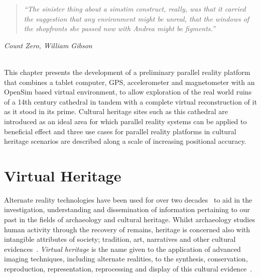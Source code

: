 \begin{quote}
	\textit{``The sinister thing about a simstim construct, really, was that it carried the suggestion that any environment might be unreal, that the windows of the shopfronts she passed now with Andrea might be figments.''}
\end{quote}
\hfill \textit{Count Zero, William Gibson}
\\
\\


\label{chapter-vtw}

This chapter presents the development of a preliminary parallel reality platform that combines a tablet computer, GPS, accelerometer and magnetometer with an OpenSim based virtual environment, to allow exploration of the real world ruins of a 14th century cathedral in tandem with a complete virtual reconstruction of it as it stood in its prime. Cultural heritage sites such as this cathedral are introduced as an ideal area for which parallel reality systems can be applied to beneficial effect and three use cases for parallel reality platforms in cultural heritage scenarios are described along a scale of increasing positional accuracy.


\section{Virtual Heritage}

Alternate reality technologies have been used for over two decades~\cite{Roussou2002} to aid in the investigation, understanding and dissemination of information pertaining to our past in the fields of archaeology and cultural heritage. Whilst archaeology studies human activity through the recovery of remains, heritage is concerned also with intangible attributes of society; tradition, art, narratives and other cultural evidences~\cite{Roussou2002}. \textit{Virtual heritage} is the name given to the application of advanced imaging techniques, including alternate realities, to the synthesis, conservation, reproduction, representation, reprocessing and display of this cultural evidence~\cite{roussou:photorealism}.

